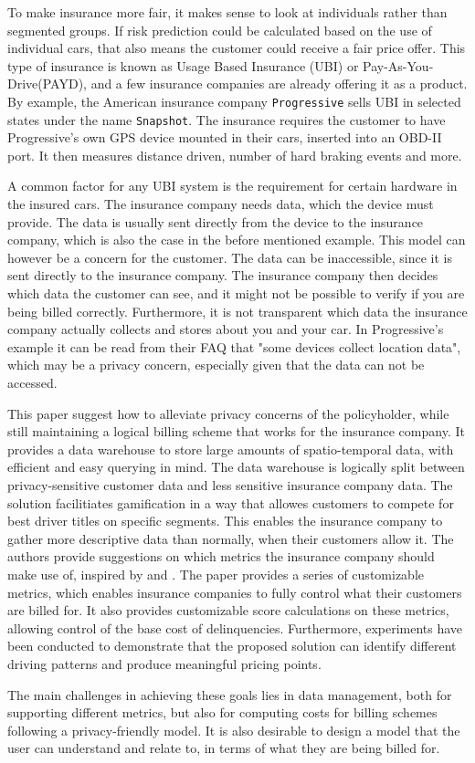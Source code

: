 To make insurance more fair, it makes sense to look at individuals rather than segmented groups. If risk prediction could be calculated based on the use of individual cars, that also means the customer could receive a fair price offer. This type of insurance is known as Usage Based Insurance (UBI) or Pay-As-You-Drive(PAYD), and a few insurance companies are already offering it as a product. By example, the American insurance company \texttt{Progressive} sells UBI in selected states under the name \texttt{Snapshot}\cite{snapshot}. The insurance requires the customer to have Progressive's own GPS device mounted in their cars, inserted into an OBD-II port. It then measures distance driven, number of hard braking events and more.

A common factor for any UBI system is the requirement for certain hardware in the insured cars. The insurance company needs data, which the device must provide. The data is usually sent directly from the device to the insurance company, which is also the case in the before mentioned example. This model can however be a concern for the customer. The data can be inaccessible, since it is sent directly to the insurance company. The insurance company then decides which data the customer can see, and it might not be possible to verify if you are being billed correctly. Furthermore, it is not transparent which data the insurance company actually collects and stores about you and your car. In Progressive's example it can be read from their FAQ that "some devices collect location data", which may be a privacy concern, especially given that the data can not be accessed.

This paper suggest how to alleviate privacy concerns of the policyholder, while still maintaining a logical billing scheme that works for the insurance company. It provides a data warehouse to store large amounts of spatio-temporal data, with efficient and easy querying in mind. The data warehouse is logically split between privacy-sensitive customer data and less sensitive insurance company data. The solution facilitiates gamification in a way that allowes customers to compete for best driver titles on specific segments. This enables the insurance company to gather more descriptive data than normally, when their customers allow it. The authors provide suggestions on which metrics the insurance company should make use of, inspired by \citet{art:insurtelematics} and \citet{art:smartphonemonitor}. The paper provides a series of customizable metrics, which enables insurance companies to fully control what their customers are billed for. It also provides customizable score calculations on these metrics, allowing control of the base cost of delinquencies. Furthermore, experiments have been conducted to demonstrate that the proposed solution can identify different driving patterns and produce meaningful pricing points.

The main challenges in achieving these goals lies in data management, both for supporting different metrics, but also for computing costs for billing schemes following a privacy-friendly model. It is also desirable to design a model that the user can understand and relate to, in terms of what they are being billed for.